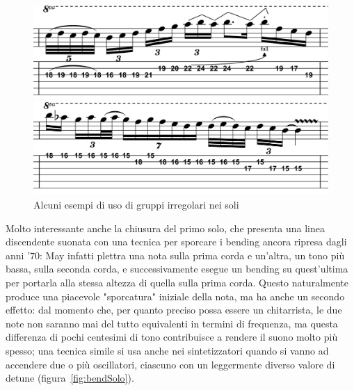 \documentclass[12pt]{article}
\begin{document}
\begin{figure}[H]
 \begin{minipage}{0.4\textwidth}
  \centering
  \includegraphics[width=\textwidth,keepaspectratio]{guitars/guit3_2}
 \end{minipage}
 \hfill
 \begin{minipage}{0.4\textwidth}
  \centering
  \includegraphics[width=\textwidth,keepaspectratio]{guitars/rhap}
 \end{minipage}

 \caption{Alcuni esempi di uso di gruppi irregolari nei soli}
 \label{fig:guitSolo}
\end{figure}

Molto interessante anche la chiusura del primo solo, che presenta una linea discendente suonata con una tecnica per sporcare i bending ancora ripresa dagli anni '\(70\): May infatti plettra una nota sulla prima corda e un'altra, un tono più bassa, sulla seconda corda, e successivamente esegue un bending su quest'ultima per portarla alla stessa altezza di quella sulla prima corda. Questo naturalmente produce una piacevole "sporcatura" iniziale della nota, ma ha anche un secondo effetto: dal momento che, per quanto preciso possa essere un chitarrista, le due note non saranno mai del tutto equivalenti in termini di frequenza, ma questa differenza di pochi centesimi di tono contribuisce a rendere il suono molto più spesso; una tecnica simile si usa anche nei sintetizzatori quando si vanno ad accendere due o più oscillatori, ciascuno con un leggermente diverso valore di detune (figura~\ref{fig:bendSolo}).
\end{document}

